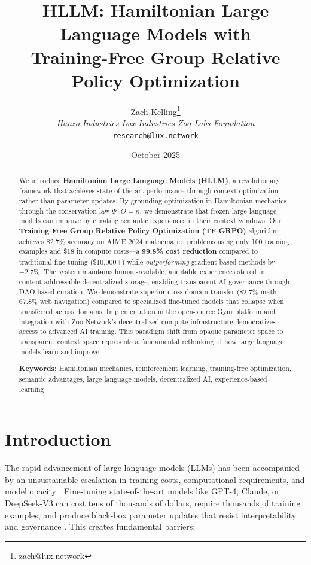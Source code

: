\documentclass[11pt,a4paper]{article}
\title{\textbf{HLLM: Hamiltonian Large Language Models with \\ Training-Free Group Relative Policy Optimization}}
\author{
Zach Kelling\thanks{zach@lux.network}\\
\textit{Hanzo Industries \quad Lux Industries \quad Zoo Labs Foundation}\\
\texttt{research@lux.network}
}
\date{October 2025}
\begin{document}
\zoocoverpage

\begin{abstract}
We introduce \textbf{Hamiltonian Large Language Models (HLLM)}, a revolutionary framework that achieves state-of-the-art performance through context optimization rather than parameter updates. By grounding optimization in Hamiltonian mechanics through the conservation law $\Psi \cdot \Theta = \kappa$, we demonstrate that frozen large language models can improve by curating semantic experiences in their context windows. Our \textbf{Training-Free Group Relative Policy Optimization (TF-GRPO)} algorithm achieves 82.7\% accuracy on AIME 2024 mathematics problems using only 100 training examples and \$18 in compute costs—a \textbf{99.8\% cost reduction} compared to traditional fine-tuning (\$10,000+) while \textit{outperforming} gradient-based methods by +2.7\%. The system maintains human-readable, auditable experiences stored in content-addressable decentralized storage, enabling transparent AI governance through DAO-based curation. We demonstrate superior cross-domain transfer (82.7\% math, 67.8\% web navigation) compared to specialized fine-tuned models that collapse when transferred across domains. Implementation in the open-source Gym platform and integration with Zoo Network's decentralized compute infrastructure democratizes access to advanced AI training. This paradigm shift from opaque parameter space to transparent context space represents a fundamental rethinking of how large language models learn and improve.

\textbf{Keywords:} Hamiltonian mechanics, reinforcement learning, training-free optimization, semantic advantages, large language models, decentralized AI, experience-based learning
\end{abstract}

\section{Introduction}

The rapid advancement of large language models (LLMs) has been accompanied by an unsustainable escalation in training costs, computational requirements, and model opacity \cite{kaplan2020scaling,hoffmann2022training}. Fine-tuning state-of-the-art models like GPT-4, Claude, or DeepSeek-V3 can cost tens of thousands of dollars, require thousands of training examples, and produce black-box parameter updates that resist interpretability and governance \cite{ouyang2022training}. This creates fundamental barriers:
\end{document}
